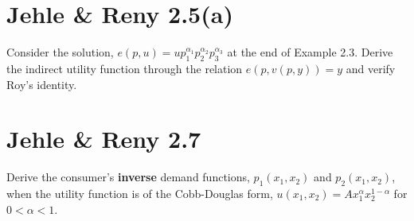 \documentclass{article}
\begin{document}
\section{Jehle \& Reny 2.5(a)}
Consider the solution, $e(p, u) = up_1^{\alpha_1}p_2^{\alpha_2}p_3^{\alpha_3}$ at the end of Example 2.3.
Derive the indirect utility function through the relation $e(p, v(p, y)) = y$ and verify Roy's
identity.

\section{Jehle \& Reny 2.7}
Derive the consumer's \textbf{inverse} demand functions, $p_1(x_1, x_2)$ and $p_2(x_1, x_2)$, 
when the utility function is of the Cobb-Douglas form, $u(x_1, x_2) = Ax_1^{\alpha}x_2^{1-\alpha}$
for $0 < \alpha < 1$.
\end{document}
